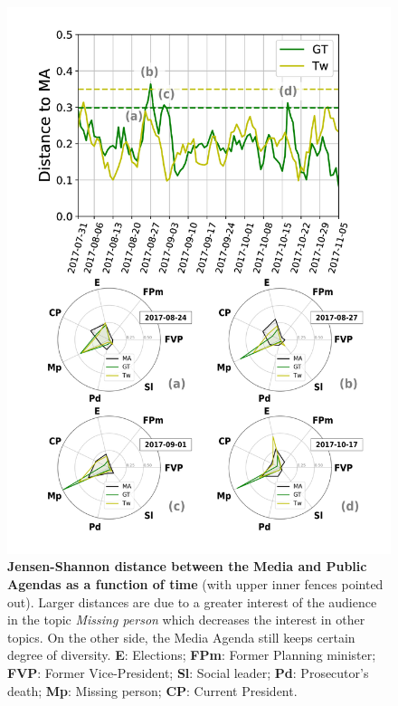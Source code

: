 \documentclass{bmcart}
\begin{document}
\begin{backmatter}
\begin{figure}[h!]
\includegraphics[height = 0.7\textheight]{Fig4.pdf}
\caption{\textbf{Jensen-Shannon distance between the Media and Public Agendas as a function of time} (with upper inner fences pointed out). Larger distances are due to a greater interest of the audience in the topic \emph{Missing person} which  decreases the interest in other topics. On the other side, the Media Agenda still keeps certain degree of diversity. \textbf{E}: Elections; \textbf{FPm}: Former Planning minister; \textbf{FVP}: Former Vice-President; \textbf{Sl}: Social leader; \textbf{Pd}: Prosecutor's death; \textbf{Mp}: Missing person; \textbf{CP}: Current President.}
\label{fig:jensen_shannon_gt}
\end{figure}


\end{backmatter}
\end{document}
